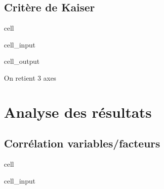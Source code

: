 \documentclass[letterpaper,10pt,french]{sphinxmanual}
\begin{document}
\subsection{Critère de Kaiser}
\label{\detokenize{acp:critere-de-kaiser}}
\begin{sphinxuseclass}{cell}
\begin{sphinxuseclass}{cell_input}
\begin{sphinxVerbatim}[commandchars=\\\{\}]
  
     
\end{sphinxVerbatim}

\end{sphinxuseclass}
\begin{sphinxuseclass}{cell_output}
\begin{sphinxVerbatim}[commandchars=\\\{\}]
On retient 3 axes
\end{sphinxVerbatim}

\end{sphinxuseclass}
\end{sphinxuseclass}

\section{Analyse des résultats}
\label{\detokenize{acp:analyse-des-resultats}}

\subsection{Corrélation variables/facteurs}
\label{\detokenize{acp:id3}}
\begin{sphinxuseclass}{cell}
\begin{sphinxuseclass}{cell_input}
\begin{sphinxVerbatim}[commandchars=\\\{\}]
  \PYG{p}{[}\PYG{p}{]}
   
    \PYG{p}{[}\PYG{p}{]}  \PYG{p}{[}\PYG{p}{]}
\end{sphinxVerbatim}

\end{sphinxuseclass}
\end{sphinxuseclass}
\end{document}

